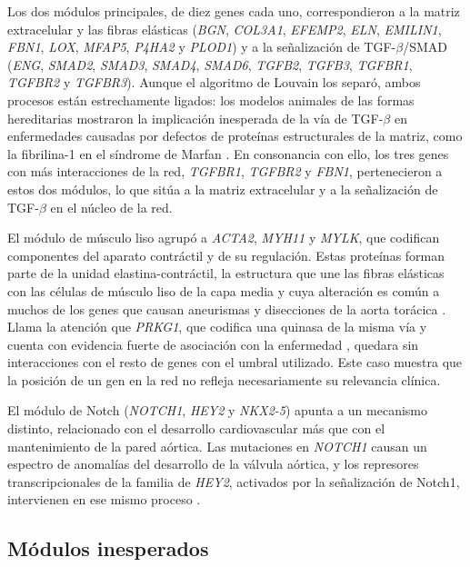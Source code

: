 Los dos módulos principales, de diez genes cada uno, correspondieron a la matriz extracelular y las fibras elásticas (\textit{BGN}, \textit{COL3A1}, \textit{EFEMP2}, \textit{ELN}, \textit{EMILIN1}, \textit{FBN1}, \textit{LOX}, \textit{MFAP5}, \textit{P4HA2} y \textit{PLOD1}) y a la señalización de TGF-$\beta$/SMAD (\textit{ENG}, \textit{SMAD2}, \textit{SMAD3}, \textit{SMAD4}, \textit{SMAD6}, \textit{TGFB2}, \textit{TGFB3}, \textit{TGFBR1}, \textit{TGFBR2} y \textit{TGFBR3}). Aunque el algoritmo de Louvain los separó, ambos procesos están estrechamente ligados: los modelos animales de las formas hereditarias mostraron la implicación inesperada de la vía de TGF-$\beta$ en enfermedades causadas por defectos de proteínas estructurales de la matriz, como la fibrilina-1 en el síndrome de Marfan \cite{Lindsay2011}. En consonancia con ello, los tres genes con más interacciones de la red, \textit{TGFBR1}, \textit{TGFBR2} y \textit{FBN1}, pertenecieron a estos dos módulos, lo que sitúa a la matriz extracelular y a la señalización de TGF-$\beta$ en el núcleo de la red.

El módulo de músculo liso agrupó a \textit{ACTA2}, \textit{MYH11} y \textit{MYLK}, que codifican componentes del aparato contráctil y de su regulación. Estas proteínas forman parte de la unidad elastina-contráctil, la estructura que une las fibras elásticas con las células de músculo liso de la capa media y cuya alteración es común a muchos de los genes que causan aneurismas y disecciones de la aorta torácica \cite{Karimi2016}. Llama la atención que \textit{PRKG1}, que codifica una quinasa de la misma vía y cuenta con evidencia fuerte de asociación con la enfermedad \cite{Pinard2019,Renard2018}, quedara sin interacciones con el resto de genes con el umbral utilizado. Este caso muestra que la posición de un gen en la red no refleja necesariamente su relevancia clínica.

El módulo de Notch (\textit{NOTCH1}, \textit{HEY2} y \textit{NKX2-5}) apunta a un mecanismo distinto, relacionado con el desarrollo cardiovascular más que con el mantenimiento de la pared aórtica. Las mutaciones en \textit{NOTCH1} causan un espectro de anomalías del desarrollo de la válvula aórtica, y los represores transcripcionales de la familia de \textit{HEY2}, activados por la señalización de Notch1, intervienen en ese mismo proceso \cite{Garg2005}.

\subsection{Módulos inesperados}

